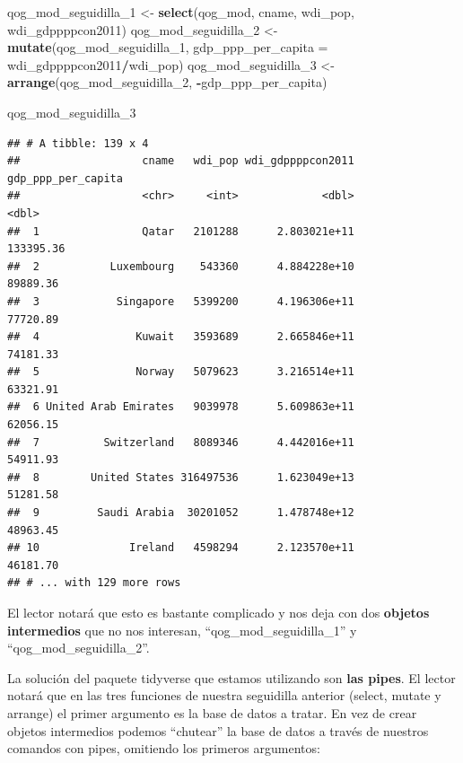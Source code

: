 \documentclass[]{book}
\newenvironment{Shaded}{\begin{snugshade}}{\end{snugshade}}
\newcommand{\KeywordTok}[1]{\textcolor[rgb]{0.13,0.29,0.53}{\textbf{#1}}}
\newcommand{\DataTypeTok}[1]{\textcolor[rgb]{0.13,0.29,0.53}{#1}}
\newcommand{\DecValTok}[1]{\textcolor[rgb]{0.00,0.00,0.81}{#1}}
\newcommand{\StringTok}[1]{\textcolor[rgb]{0.31,0.60,0.02}{#1}}
\newcommand{\OperatorTok}[1]{\textcolor[rgb]{0.81,0.36,0.00}{\textbf{#1}}}
\newcommand{\NormalTok}[1]{#1}
\begin{document}
\begin{Shaded}
\begin{Highlighting}[]
\NormalTok{qog_mod_seguidilla_}\DecValTok{1}\NormalTok{ <-}\StringTok{ }\KeywordTok{select}\NormalTok{(qog_mod, cname, wdi_pop, wdi_gdppppcon2011)}
\NormalTok{qog_mod_seguidilla_}\DecValTok{2}\NormalTok{ <-}\StringTok{ }\KeywordTok{mutate}\NormalTok{(qog_mod_seguidilla_}\DecValTok{1}\NormalTok{, }
                               \DataTypeTok{gdp_ppp_per_capita =}\NormalTok{ wdi_gdppppcon2011}\OperatorTok{/}\NormalTok{wdi_pop)}
\NormalTok{qog_mod_seguidilla_}\DecValTok{3}\NormalTok{ <-}\StringTok{ }\KeywordTok{arrange}\NormalTok{(qog_mod_seguidilla_}\DecValTok{2}\NormalTok{, }\OperatorTok{-}\NormalTok{gdp_ppp_per_capita)}
\end{Highlighting}
\end{Shaded}

\begin{Shaded}
\begin{Highlighting}[]
\NormalTok{qog_mod_seguidilla_}\DecValTok{3}
\end{Highlighting}
\end{Shaded}

\begin{verbatim}
## # A tibble: 139 x 4
##                   cname   wdi_pop wdi_gdppppcon2011 gdp_ppp_per_capita
##                   <chr>     <int>             <dbl>              <dbl>
##  1                Qatar   2101288      2.803021e+11          133395.36
##  2           Luxembourg    543360      4.884228e+10           89889.36
##  3            Singapore   5399200      4.196306e+11           77720.89
##  4               Kuwait   3593689      2.665846e+11           74181.33
##  5               Norway   5079623      3.216514e+11           63321.91
##  6 United Arab Emirates   9039978      5.609863e+11           62056.15
##  7          Switzerland   8089346      4.442016e+11           54911.93
##  8        United States 316497536      1.623049e+13           51281.58
##  9         Saudi Arabia  30201052      1.478748e+12           48963.45
## 10              Ireland   4598294      2.123570e+11           46181.70
## # ... with 129 more rows
\end{verbatim}

El lector notará que esto es bastante complicado y nos deja con dos
\textbf{objetos intermedios} que no nos interesan,
``qog\_mod\_seguidilla\_1'' y ``qog\_mod\_seguidilla\_2''.

La solución del paquete tidyverse que estamos utilizando son \textbf{las
pipes}. El lector notará que en las tres funciones de nuestra seguidilla
anterior (select, mutate y arrange) el primer argumento es la base de
datos a tratar. En vez de crear objetos intermedios podemos ``chutear''
la base de datos a través de nuestros comandos con pipes, omitiendo los
primeros argumentos:
\end{document}
